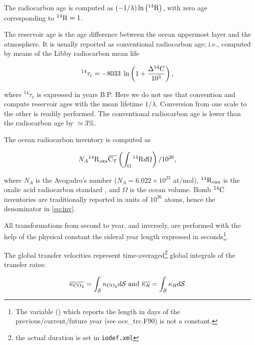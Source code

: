 \documentclass[../main/TOP_manual]{subfiles}
\begin{document}
The radiocarbon age is computed as  $(-1/\lambda) \ln{ \left( \mathrm{^{14}{R}}\right)}$, with zero age corresponding to $\mathrm{^{14}{R}}=1$.

The reservoir age is the age difference between the ocean uppermost layer and the atmosphere.
It is usually reported as conventional radiocarbon age; i.e., computed by means of the Libby radiocarbon mean life \cite[8033 yr;][]{stuiver_1977}

\begin{align}
{^{14}\tau_\mathrm{c}}= -8033 \; \ln \left(1 + \frac{\Delta ^{14}\mathrm{C}}{10^3}\right), \label{eq:convage}
\end{align}

where ${^{14}\tau_\mathrm{c}}$ is expressed in years B.P.
Here we do not use that convention and compute reservoir ages with the mean lifetime $1/\lambda$.
Conversion from one scale to the other is readily performed.
The conventional radiocarbon age is lower than the radiocarbon age by $\simeq3\%$.

The ocean radiocarbon  inventory is computed as

\begin{equation}
N_A \mathrm{^{14}{R}}_\mathrm{oxa} \overline{\mathrm{C_T}} \left( \int_\Omega \mathrm{^{14}{R}} d\Omega \right) /10^{26}, \label{eq:inv}
\end{equation}

where $N_A$ is the Avogadro's number ($N_A=6.022\times10^{23}$ at/mol), $\mathrm{^{14}{R}}_\mathrm{oxa}$ is the oxalic acid radiocarbon standard \cite[$\Rq_\mathrm{oxa}=1.176\times10^{-12}$;][]{stuiver_1977}, and $\Omega$ is the ocean volume.
Bomb $\mathrm{^{14}C}$ inventories are traditionally reported in units of $10^{26}$ atoms, hence the denominator in \autoref{eq:inv}.

All transformations from second to year, and inversely, are performed with the help of the physical constant  the sideral year length expressed in seconds\footnote{The variable () which reports the length in days of the previous/current/future year (see \textrm{oce\_trc.F90}) is not a constant. }.

The global transfer velocities represent time-averaged\footnote{the actual duration is set in \texttt{iodef.xml}} global integrals of the transfer rates:

\begin{equation}
 \overline{\kappa_{\mathrm{CO_2}}}= \int_\mathcal{S} \kappa_{\mathrm{CO_2}} d\mathcal{S}  \text{ and } \overline{\kappa_R}= \int_\mathcal{S} \kappa_R d\mathcal{S}
\end{equation}
\end{document}
